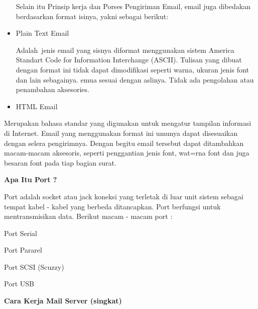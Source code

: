 \documentclass{wileySix}
\begin{document}
\begin{myEnumerate}
\begin{itemize}
		\vspace{12pt}
		Selain itu Prinsip kerja dan Porses Pengiriman Email, email juga dibedakan berdasarkan format isinya, yakni sebagai berikut: \par
		\vspace{12pt}
		\noindent 
		\item Plain Text Email \par
		Adalah~jenis email yang sisnya diformat menggunakan sistem America  Standart Code for Information Interchange (ASCII). Tulisan yang dibuat dengan format ini tidak dapat dimodifikasi seperti warna, ukuran jenis font dan lain sebagainya. emua sesuai dengan aslinya. Tidak ada pengolahan atau penambahan aksesories. \par
		\vspace{12pt}
		\vspace{12pt}
		\vspace{12pt}
		\noindent 
		\item HTML Email\end{itemize}
	\par
	Merupakan bahasa standar yang digunakan untuk mengatur tampilan informasi di Internet. Email yang menggunakan format ini umunya dapat disesuaikan dengan selera pengirimnya. Dengan begitu email tersebut dapat ditambahkan macam-macam aksesoris, seperti penggantian jenis font, wat=rna font dan juga besaran font pada tiap bagian surat. \par
	\vspace{12pt}
	\noindent 
	\textbf{Apa Itu Port ?} \par
	Port adalah socket atau jack koneksi yang terletak di luar unit sistem sebagai tempat kabel - kabel yang berbeda ditancapkan. Port berfungsi untuk mentransmisikan data. Berikut macam - macam port : \par
	\noindent 
	\begin{myEnumerate}
		\item Port Serial \par
		\noindent 
		\item Port Pararel \par
		\noindent 
		\item Port SCSI (Scuzzy) \par
		\noindent 
		\item Port USB \end{myEnumerate}
	\par
	\vspace{12pt}
	\noindent 
	\textbf{Cara Kerja Mail Server (singkat)} \par

\end{myEnumerate}
\end{document}
